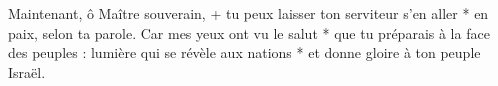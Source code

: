 Maintenant, ô Maître souverain, +
tu peux laisser ton serviteur s'en aller *
en paix, selon ta parole.
\versseparator
Car mes yeux ont vu le salut *
que tu préparais à la face des peuples :
\versseparator
lumière qui se révèle aux nations *
et donne gloire à ton peuple Israël.
